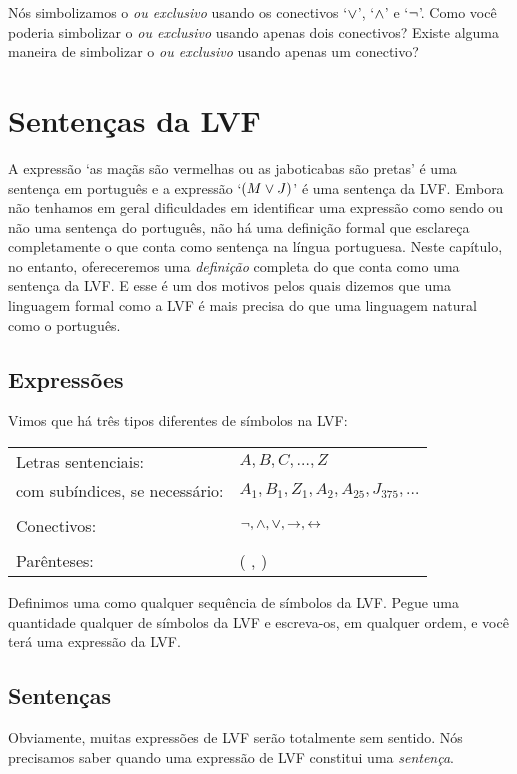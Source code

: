 \problempart
Nós simbolizamos o \emph{ou exclusivo} usando os conectivos `$\vee$', `$\wedge$' e `$\neg$'.
Como você poderia simbolizar o \emph{ou exclusivo} usando apenas dois conectivos?
Existe alguma maneira de simbolizar o \emph{ou exclusivo} usando apenas um conectivo?


\chapter{Sentenças da LVF}\label{s:TFLSentences}
A expressão `as maçãs são vermelhas ou as jaboticabas são pretas' é uma sentença em português e a expressão `$(M \vee J)$' é uma sentença da LVF.
Embora não tenhamos em geral dificuldades em identificar uma expressão como sendo ou não uma sentença do português, não há uma definição formal que esclareça completamente o que conta como sentença na língua portuguesa.
Neste capítulo, no entanto, ofereceremos uma \emph{definição} completa do que conta como uma sentença da LVF.
E esse é um dos motivos pelos quais dizemos que uma linguagem formal como a LVF é mais precisa do que uma linguagem natural como o português.


\section{Expressões}

Vimos que há três tipos diferentes de símbolos na LVF:
\begin{center}
\begin{tabular}{l l}
Letras sentenciais: & $A,B,C,\ldots,Z$\\
com subíndices, se necessário: & $A_1, B_1,Z_1,A_2,A_{25},J_{375},\ldots$\\
\\
Conectivos: & $\neg,\wedge,\vee,\rightarrow,\leftrightarrow$\\
\\
Parênteses: &( , )\\
\end{tabular}
\end{center}
Definimos uma  como qualquer sequência de símbolos da LVF.
Pegue uma quantidade qualquer de símbolos da LVF e escreva-os, em qualquer ordem, e você terá uma expressão da LVF.


\section{Sentenças}\label{s:Sentences}
Obviamente, muitas expressões de LVF serão totalmente sem sentido.
Nós precisamos saber quando uma expressão de LVF constitui uma \emph{sentença}.

